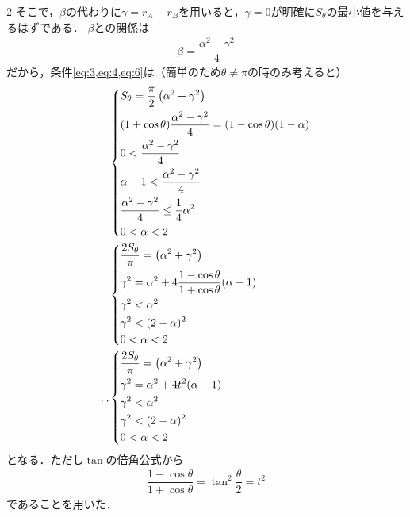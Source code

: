 \documentclass[../../main.tex]{subfiles}
\begin{document}
\begin{multicols}{2}
  そこで，$\beta$の代わりに$\gamma=r_{A}-r_{B}$を用いると，$\gamma=0$が明確に$S_{\theta}$の最小値を与えるはずである．
  $\beta$との関係は
  \begin{align}
    \beta = \dfrac{\alpha^2 -\gamma^2}{4}
  \end{align}
  だから，条件\cref{eq:3,eq:4,eq:6}は（簡単のため$\theta\neq\pi$の時のみ考えると）
  \begin{align}
    &
    \begin{dcases}
      S_{\theta} = \dfrac{\pi}{2}\left(\alpha^2+\gamma^2\right)              \\
      (1+\cos\theta)\dfrac{\alpha^2 -\gamma^2}{4} = (1-\cos\theta)(1-\alpha) \\
      0 < \dfrac{\alpha^2 -\gamma^2}{4}                                      \\
      \alpha-1 < \dfrac{\alpha^2 -\gamma^2}{4}                               \\
      \dfrac{\alpha^2 -\gamma^2}{4} \le \dfrac{1}{4}\alpha^2                  \\
      0 < \alpha < 2
    \end{dcases}                \\
    &
    \begin{dcases}
      \dfrac{2S_{\theta}}{\pi} = \left(\alpha^2+\gamma^2\right)           \\
      \gamma^2 = \alpha^2 + 4\dfrac{1-\cos\theta}{1+\cos\theta}(\alpha-1) \\
      \gamma^2 < \alpha^2                                                \\
      \gamma^2 < (2-\alpha)^2                                            \\
      0 < \alpha < 2
    \end{dcases} \\
    \therefore
    &
    \begin{dcases}
      \dfrac{2S_{\theta}}{\pi} = \left(\alpha^2+\gamma^2\right)           \\
      \gamma^2 = \alpha^2 + 4t^2(\alpha-1) \\
      \gamma^2 < \alpha^2                                                \\
      \gamma^2 < (2-\alpha)^2                                            \\
      0 < \alpha < 2
    \end{dcases}
  \end{align}
  となる．ただし$\tan$の倍角公式から
  \begin{align}
    \dfrac{1-\cos\theta}{1+\cos\theta} = \tan^2 \dfrac{\theta}{2} = t^2
  \end{align}
  であることを用いた．


\end{multicols}
\end{document}
